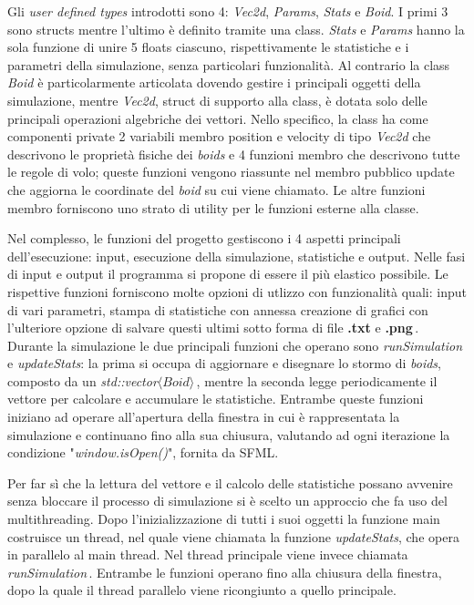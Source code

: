 \documentclass{article}
\begin{document}
Gli \textit{user defined types} introdotti sono 4: \textit{Vec\textunderscore2d}, \textit{Params}, \textit{Stats} e \textit{Boid}. I primi 3 sono structs mentre l'ultimo è definito tramite una class. \textit{Stats} e \textit{Params} hanno la sola funzione di unire 5 floats ciascuno, rispettivamente le statistiche e i parametri della simulazione, senza particolari funzionalità. Al contrario la class \textit{Boid} è particolarmente articolata dovendo gestire i principali oggetti della simulazione, mentre \textit{Vec\textunderscore2d}, struct di supporto alla class, è dotata solo delle principali operazioni algebriche dei vettori. Nello specifico, la class ha come componenti private 2 variabili membro position e velocity di tipo \textit{Vec\textunderscore2d} che descrivono le proprietà fisiche dei \textit{boids} e 4 funzioni membro che descrivono tutte le regole di volo; queste funzioni vengono riassunte nel membro pubblico update che aggiorna le coordinate del \textit{boid} su cui viene chiamato. Le altre funzioni membro forniscono uno strato di utility per le funzioni esterne alla classe.


Nel complesso, le funzioni del progetto gestiscono i 4 aspetti principali dell'esecuzione:
input, esecuzione della simulazione, statistiche e output. Nelle fasi di input e output il programma si propone di essere il più elastico possibile. Le rispettive funzioni forniscono molte opzioni di utlizzo con funzionalità quali: input di vari parametri, stampa di statistiche con annessa creazione di grafici con l'ulteriore opzione di salvare questi ultimi sotto forma di file \textbf{.txt} e \textbf{.png}\,.
Durante la simulazione le due principali funzioni che operano sono \textit{runSimulation} e \textit{updateStats}: la prima si occupa di aggiornare e disegnare lo stormo di \textit{boids}, composto da un \textit{std::vector$\langle Boid\rangle$}\,, mentre la seconda legge periodicamente il vettore  per calcolare e accumulare le statistiche. Entrambe queste funzioni iniziano ad operare all'apertura della finestra in cui è rappresentata la simulazione e continuano fino alla sua chiusura, valutando ad ogni iterazione la condizione "\textit{window.isOpen()}", fornita da SFML. 

Per far sì che la lettura del vettore e il calcolo delle statistiche possano avvenire senza bloccare il processo di simulazione si è scelto un approccio che fa uso del multithreading. Dopo l'inizializzazione di tutti i suoi oggetti la funzione main costruisce un thread, nel quale viene chiamata la funzione \textit{updateStats}, che opera in parallelo al main thread. Nel thread principale viene invece chiamata  \textit{runSimulation}\,. Entrambe le funzioni operano fino alla chiusura della finestra, dopo la quale il thread parallelo viene ricongiunto a quello principale. 
\end{document}
